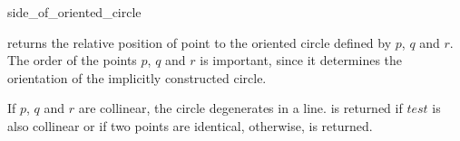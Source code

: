 \begin{ccRefFunction}{side_of_oriented_circle}

         {returns the relative position of point 
          to the oriented circle defined by $p$, $q$ and $r$.
	  The order of the points $p$, $q$ and $r$ is important,
	  since it determines the orientation of the implicitly
          constructed circle.

If $p$, $q$ and $r$ are collinear, the circle degenerates in a line.
 is returned if $test$ is also collinear or if two
points are identical, 
otherwise,  is returned.
}

\ccSeeAlso

 \\

\end{ccRefFunction}

